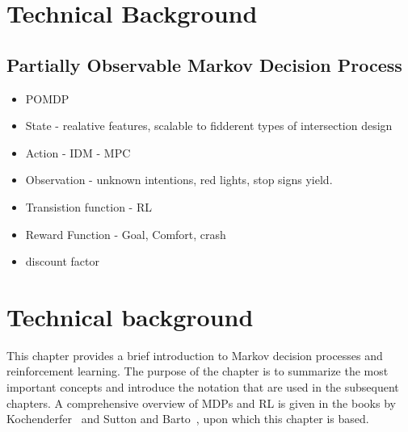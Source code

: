 \chapter{Technical Background}\label{chapter:background}
%

\section{Partially Observable Markov Decision Process}\label{section:pomdp}

\begin{itemize}
    \item POMDP
    \item State - realative features, scalable to fidderent types of intersection design 
    \item Action - IDM - MPC
    \item Observation - unknown intentions, red lights, stop signs yield. 
    \item Transistion function - RL 
    \item Reward Function - Goal, Comfort, crash
    \item discount factor 
\end{itemize}

\chapter{Technical background}
\label{ch:theoreticalBackground}



This chapter provides a brief introduction to Markov decision processes and reinforcement learning.
The purpose of the chapter is to summarize the most important concepts and introduce the notation that are used in the subsequent chapters. 
A comprehensive overview of MDPs and RL is given in the books by Kochenderfer~\cite{Kochenderfer2015} and Sutton and Barto~\cite{Sutton2018}, upon which this chapter is based.


